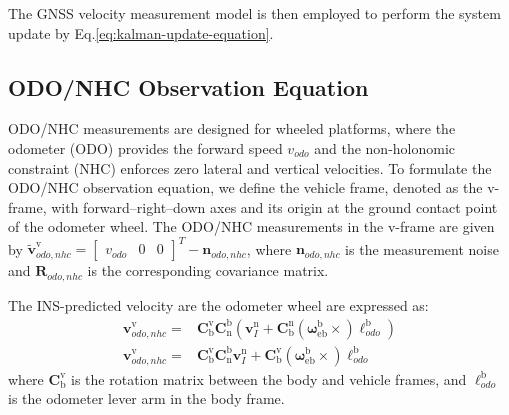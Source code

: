 \documentclass{article}
\begin{document}
The GNSS velocity measurement model is then employed to perform the system update by Eq.\eqref{eq:kalman-update-equation}.


\subsection{ODO/NHC Observation Equation}
ODO/NHC measurements are designed for wheeled platforms, where the odometer (ODO) provides the forward speed $v_{odo}$ and the non-holonomic constraint (NHC) enforces zero lateral and vertical velocities. To formulate the ODO/NHC observation equation, we define the vehicle frame, denoted as the $\mathrm{v}$-frame, with forward–right–down axes and its origin at the ground contact point of the odometer wheel. The ODO/NHC measurements in the $\mathrm{v}$-frame are given by $\tilde{\boldsymbol{v}}_{odo,nhc}^{\mathrm{v}} = \begin{bmatrix} v_{odo} & 0 & 0 \end{bmatrix}^T - \boldsymbol{n}_{odo,nhc}$, where $\boldsymbol{n}_{odo,nhc}$ is the measurement noise and $\boldsymbol{R}_{odo,nhc}$ is the corresponding covariance matrix.

The INS-predicted velocity are the odometer wheel are expressed as:
\begin{equation}
    \label{eq:odo-nhc-velocity-predicted-by-ins-velocity}
    \begin{aligned}
        \boldsymbol{v}_{odo,nhc}^{\mathrm{v}} =& \mathbf{C}_{\mathrm{b}}^{\mathrm{v}} \mathbf{C}_{\mathrm{n}}^{\mathrm{b}} \left( \boldsymbol{v}_{I}^{\mathrm{n}} + \mathbf{C}_{\mathrm{b}}^{\mathrm{n}} \left(\boldsymbol{\omega}_{\mathrm{e} \mathrm{b}}^{\mathrm{b}} \times \right) \boldsymbol{\ell}_{odo}^{\mathrm{b}} \right) \\
        \boldsymbol{v}_{odo,nhc}^{\mathrm{v}} =& \mathbf{C}_{\mathrm{b}}^{\mathrm{v}} \mathbf{C}_{\mathrm{n}}^{\mathrm{b}} \boldsymbol{v}_{I}^{\mathrm{n}} + \mathbf{C}_{\mathrm{b}}^{\mathrm{v}} \left(\boldsymbol{\omega}_{\mathrm{e} \mathrm{b}}^{\mathrm{b}} \times \right) \boldsymbol{\ell}_{odo}^{\mathrm{b}}
    \end{aligned}
\end{equation}
where $\mathbf{C}_{\mathrm{b}}^{\mathrm{v}}$ is the rotation matrix between the body and vehicle frames, and $\boldsymbol{\ell}_{odo}^{\mathrm{b}}$ is the odometer lever arm in the body frame.
\end{document}
